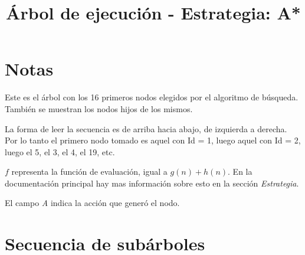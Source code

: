 \documentclass[a0,landscale]{a0poster}
\title{Árbol de ejecución - Estrategia: A*}
\author{}
\begin{document}
\maketitle

\section{Notas}
Este es el árbol con los 16 primeros nodos elegidos por el algoritmo de
búsqueda. También se muestran los nodos hijos de los mismos.

La forma de leer la secuencia es de arriba hacia abajo, de izquierda a derecha.
Por lo tanto el primero nodo tomado es aquel con Id = 1, luego aquel con Id =
2, luego el 5, el 3, el 4, el 19, etc.

$f$ representa la función de evaluación, igual a $g(n) + h(n)$. En la
documentación principal hay mas información sobre esto en la sección
\emph{Estrategia}.

El campo \emph{A} indica la acción que generó el nodo.

\section{Secuencia de subárboles}
\end{document}
